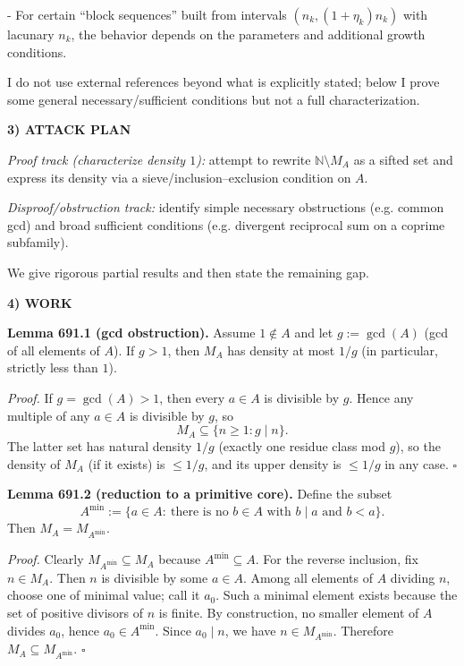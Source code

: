 - For certain “block sequences” built from intervals $(n_k,(1+\eta_k)n_k)$ with lacunary $n_k$, the behavior depends on the parameters and additional growth conditions.

I do not use external references beyond what is explicitly stated; below I prove some general necessary/sufficient conditions but not a full characterization.

\bigskip
\noindent\textbf{3) ATTACK PLAN}

\emph{Proof track (characterize density $1$):} attempt to rewrite $\mathbb{N}\setminus M_A$ as a sifted set and express its density via a sieve/inclusion--exclusion condition on $A$.

\emph{Disproof/obstruction track:} identify simple necessary obstructions (e.g. common gcd) and broad sufficient conditions (e.g. divergent reciprocal sum on a coprime subfamily).

We give rigorous partial results and then state the remaining gap.

\bigskip
\noindent\textbf{4) WORK}

\noindent\textbf{Lemma 691.1 (gcd obstruction).}
Assume $1\notin A$ and let $g:=\gcd(A)$ (gcd of all elements of $A$). If $g>1$, then $M_A$ has density at most $1/g$ (in particular, strictly less than $1$).

\smallskip
\noindent\emph{Proof.}
If $g=\gcd(A)>1$, then every $a\in A$ is divisible by $g$. Hence any multiple of any $a\in A$ is divisible by $g$, so
\[
M_A\subseteq \{n\ge 1: g\mid n\}.
\]
The latter set has natural density $1/g$ (exactly one residue class mod $g$), so the density of $M_A$ (if it exists) is $\le 1/g$, and its upper density is $\le 1/g$ in any case. \hfill$\square$

\medskip
\noindent\textbf{Lemma 691.2 (reduction to a primitive core).}
Define the subset
\[
A^{\min}:=\{a\in A:\ \text{there is no }b\in A\text{ with }b\mid a\text{ and }b<a\}.
\]
Then $M_A=M_{A^{\min}}$.

\smallskip
\noindent\emph{Proof.}
Clearly $M_{A^{\min}}\subseteq M_A$ because $A^{\min}\subseteq A$.
For the reverse inclusion, fix $n\in M_A$. Then $n$ is divisible by some $a\in A$. Among all elements of $A$ dividing $n$, choose one of minimal value; call it $a_0$. Such a minimal element exists because the set of positive divisors of $n$ is finite. By construction, no smaller element of $A$ divides $a_0$, hence $a_0\in A^{\min}$. Since $a_0\mid n$, we have $n\in M_{A^{\min}}$. Therefore $M_A\subseteq M_{A^{\min}}$. \hfill$\square$

